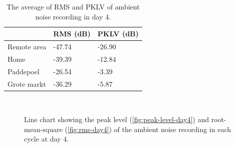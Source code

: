 	\begin{table}[H]
	\centering
	\caption[]
	{The average of RMS and PKLV of ambient noise recording in day 4.}
	\label{tab:ambient-noise-average-day4}
	\begin{tabular}{lll}
	\toprule
	            & \ac{RMS} (dB) & \ac{PKLV} (dB) \\ \midrule
	Remote area &  -47.74           &  -26.90    \\
	Home        &  -39.39         & -12.84       \\
	Paddepoel   & -26.54          &  -3.39       \\
	Grote markt & -36.29             & -5.87     \\ \bottomrule
	\end{tabular}
	\end{table}

	\begin{figure}[H]
		\\
		\caption[Line chart of ambient noise at day 4]{Line chart showing the peak level (\ref{fig:peak-level-day4}) and root-mean-square (\ref{fig:rms-day4}) of the ambient noise recording in each cycle at day 4.}
	\label{fig:audio-result-day4}
	\end{figure}

